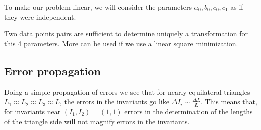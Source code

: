 To make our problem linear, we will consider the parameters $a_0, b_0, c_0, c_1$ as if they were independent.

Two data points pairs are sufficient to determine uniquely a transformation for this 4 parameters. 
More can be used if we use a linear square minimization.


\subsection{Error propagation}

Doing a simple propagation of errors we see that for nearly equilateral triangles $L_{1} \approx L_{2} \approx L_{3} \approx L$, 
the errors in the invariants go like $\Delta I_{i} \sim \frac{\Delta L}{L}$.
This means that, for invariants near $(I_{1}, I_{2}) = (1, 1)$ errors in the determination of the lengths of the triangle side will not magnify errors in the invariants.

